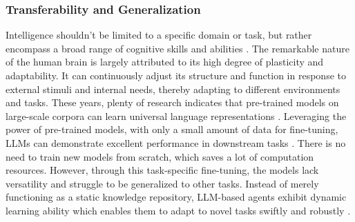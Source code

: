 \subsubsection{Transferability and Generalization} \label{sec:transferability and generalization}
Intelligence shouldn't be limited to a specific domain or task, but rather encompass a broad range of cognitive skills and abilities \cite{DBLP:journals/corr/abs-2303-12712}. The remarkable nature of the human brain is largely attributed to its high degree of plasticity and adaptability. It can continuously adjust its structure and function in response to external stimuli and internal needs, thereby adapting to different environments and tasks. These years, plenty of research indicates that pre-trained models on large-scale corpora can learn universal language representations \cite{barandiaran2009defining, peters-etal-2018-deep, DBLP:conf/naacl/DevlinCLT19}. Leveraging the power of pre-trained models, with only a small amount of data for fine-tuning, LLMs can demonstrate excellent performance in downstream tasks \cite{solaiman2021process}. There is no need to train new models from scratch, which saves a lot of computation resources. However, through this task-specific fine-tuning, the models lack versatility and struggle to be generalized to other tasks. Instead of merely functioning as a static knowledge repository, LLM-based agents exhibit dynamic learning ability which enables them to adapt to novel tasks swiftly and robustly \cite{DBLP:conf/nips/Ouyang0JAWMZASR22, DBLP:conf/iclr/WeiBZGYLDDL22, DBLP:conf/iclr/SanhWRBSACSRDBX22}.

